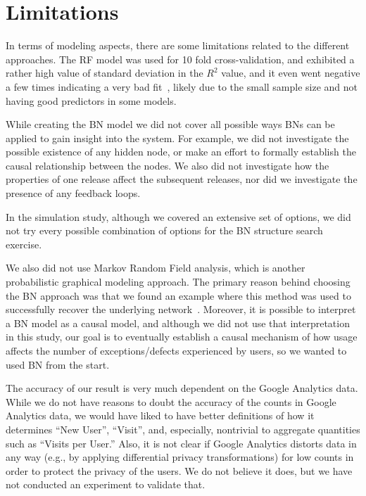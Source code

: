\documentclass[smallextended]{svjour3}       %
\begin{document}
\section{Limitations}\label{s:limitation}

In terms of modeling aspects, there are some limitations related to the different approaches.
 The RF model was used for 10 fold cross-validation, and exhibited a rather high value of standard deviation in the $R^2$ value, and it even went negative a few times indicating a very bad fit~\cite{negRsq},  likely due to the small sample size and not having good predictors in some models.

While creating the BN model we did not cover all possible ways BNs can be applied to gain insight into the system. For example, we did not investigate the possible existence of any hidden node, or make an effort to formally establish the causal relationship between the nodes. We also did not investigate how the properties of one release affect the subsequent releases, nor did we investigate the presence of any feedback loops.

In the simulation study, although we covered an extensive set of options, we did not try every possible combination of options for the BN structure search exercise.

We also did not use Markov Random Field analysis, which is another probabilistic graphical modeling approach. The primary reason behind choosing the BN approach was that we found an example where this method was used to successfully recover the underlying network~\cite{bnppt}. 
Moreover, it is possible to interpret a BN model as a causal model, and although we did not use that interpretation in this study, our goal is to eventually establish a causal mechanism of how usage affects the number of exceptions/defects experienced by users, so we wanted to used BN from the start.


The accuracy of our result is very much dependent on the Google
Analytics data. While we do not have reasons to doubt the accuracy of
the counts in Google
Analytics data, we would have liked to have better definitions of
how it determines ``New User'', ``Visit'', and, especially,
nontrivial to aggregate quantities such as ``Visits per User.'' Also,
it is not clear if Google
Analytics distorts data in any way (e.g., by applying differential 
privacy transformations) for low counts in order to protect
the privacy of the users. We do not believe it does, but we have not
conducted an experiment to validate that. 
\end{document}
